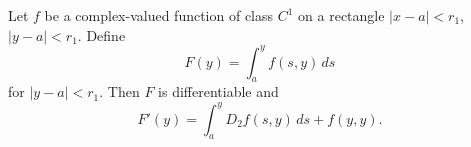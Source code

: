 Let $f$ be a complex-valued function of class $C^1$ on a rectangle $|x - a| < r_1$, $|y - a| < r_1$. Define
$$
F(y) = \int_a^y f(s, y) \, ds
$$
for $|y - a| < r_1$. Then $F$ is differentiable and
$$
F'(y) = \int_a^y D_2 f(s, y) \, ds + f(y, y).
$$
